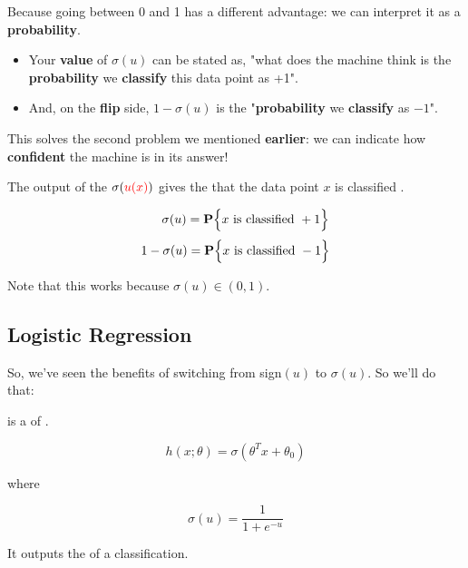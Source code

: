         Because going between 0 and 1 has a different advantage: we can interpret it as a \textbf{probability}.

        \begin{itemize}
            \item Your \textbf{value} of $\sigma(u)$ can be stated as, "what does the machine think is the \textbf{probability} we \textbf{classify} this data point as +1".
            \item And, on the \textbf{flip} side, $1-\sigma(u)$ is the "\textbf{probability} we \textbf{classify} as $-1$".
        \end{itemize}
        
        
        This solves the second problem we mentioned \textbf{earlier}: we can indicate how \textbf{confident} the machine is in its answer!\\
        
        \begin{concept}
            The output of the  $\sigma(\textcolor{red}{u(x)})$ gives the  that the data point $x$ is classified .
            
            \begin{equation*}
                \quad \;\; \sigma(u) = \mathbf{P} \Bigl\{ x\text{ is classified }+1 \Bigr\}
            \end{equation*}
            \begin{equation*}
                1 - \sigma(u) = \mathbf{P} \Bigl\{ x\text{ is classified }-1 \Bigr\}
            \end{equation*}
            
            Note that this works because $\sigma(u) \in (0,1)$.
        \end{concept}
        
    \subsection{Logistic Regression}
    
        So, we've seen the benefits of switching from sign$(u)$ to $\sigma(u)$. So we'll do that:
            \\
        
        
        \begin{kequation}
             is a  of .
            
            \begin{equation*}
                h(x; \theta) = \sigma(\theta^T x + \theta_0 )
            \end{equation*}
        
            \centerline{where}
            
            \begin{equation*}
                \sigma(u) = \frac{1}{1+e^{-u}}
            \end{equation*}
            
            It outputs the  of a  classification.
        \end{kequation}
        
